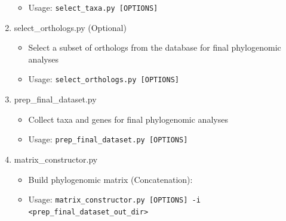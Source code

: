 \documentclass{article}
\def\code#1{\texttt{#1}}
\begin{document}
\begin{enumerate}[itemsep=12pt]
\begin{itemize}[noitemsep,topsep=0pt]
                    \item Usage: \code{select\_taxa.py [OPTIONS]}
                \end{itemize}
            \item select\_orthologs.py (Optional)
            \begin{itemize}[noitemsep,topsep=0pt]
                \item Select a subset of orthologs from the database for final phylogenomic analyses
                \item Usage: \code{select\_orthologs.py [OPTIONS]}
            \end{itemize}
            \item prep\_final\_dataset.py
            \begin{itemize}[noitemsep,topsep=0pt]
                \item Collect taxa and genes for final phylogenomic analyses
                \item Usage: \code{prep\_final\_dataset.py [OPTIONS]}
            \end{itemize}
            \item matrix\_constructor.py
            \begin{itemize}[noitemsep,topsep=0pt]
                \item Build phylogenomic matrix (Concatenation):
                \item Usage: \code{matrix\_constructor.py [OPTIONS] -i <prep\_final\_dataset\_out\_dir>}
            \end{itemize}
    \end{enumerate}
\vspace{1.5cm}
\end{document}
